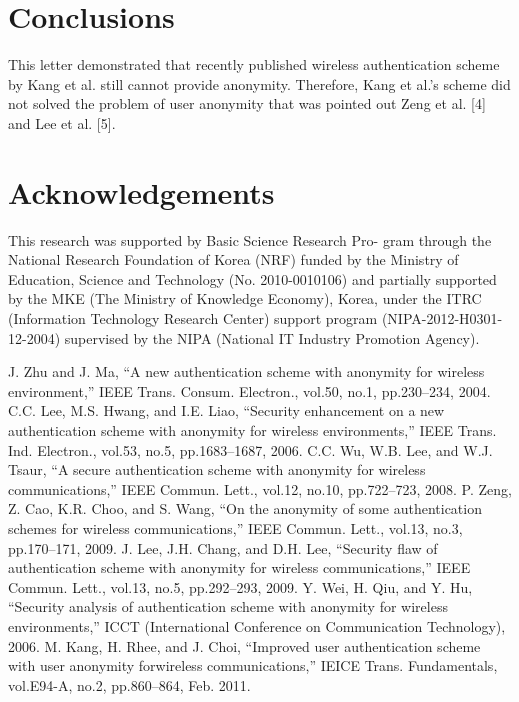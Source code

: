 \documentclass[letter]{ieice}%
\begin{document}
\section{Conclusions}
This letter demonstrated that recently published wireless authentication scheme by Kang et al. still cannot provide anonymity. Therefore, Kang et al.’s scheme did not solved
the problem of user anonymity that was pointed out Zeng
et al. [4] and Lee et al. [5].
\section*{Acknowledgements}
This research was supported by Basic Science Research Pro-
gram through the National Research Foundation of Korea
(NRF) funded by the Ministry of Education, Science and
Technology (No. 2010-0010106) and partially supported by
the MKE (The Ministry of Knowledge Economy), Korea,
under the ITRC (Information Technology Research Center)
support program (NIPA-2012-H0301-12-2004) supervised
by the NIPA (National IT Industry Promotion Agency).
\begin{thebibliography}{00}
J. Zhu and J. Ma, “A new authentication scheme with anonymity for wireless environment,” IEEE Trans. Consum. Electron., vol.50, no.1, pp.230–234, 2004.
C.C. Lee, M.S. Hwang, and I.E. Liao, “Security enhancement on a new authentication scheme with anonymity for wireless environments,” IEEE Trans. Ind. Electron., vol.53, no.5, pp.1683–1687, 2006.
C.C. Wu, W.B. Lee, and W.J. Tsaur, “A secure authentication scheme with anonymity for wireless communications,” IEEE Commun. Lett., vol.12, no.10, pp.722–723, 2008.
P. Zeng, Z. Cao, K.R. Choo, and S. Wang, “On the anonymity of some authentication schemes for wireless communications,” IEEE Commun. Lett., vol.13, no.3, pp.170–171, 2009.
J. Lee, J.H. Chang, and D.H. Lee, “Security flaw of authentication scheme with anonymity for wireless communications,” IEEE Commun. Lett., vol.13, no.5, pp.292–293, 2009.
Y. Wei, H. Qiu, and Y. Hu, “Security analysis of authentication scheme with anonymity for wireless environments,” ICCT (International Conference on Communication Technology), 2006.
 M. Kang, H. Rhee, and J. Choi, “Improved user authentication scheme with user anonymity forwireless communications,” IEICE Trans. Fundamentals, vol.E94-A, no.2, pp.860–864, Feb. 2011.
\end{thebibliography}
\end{document}

